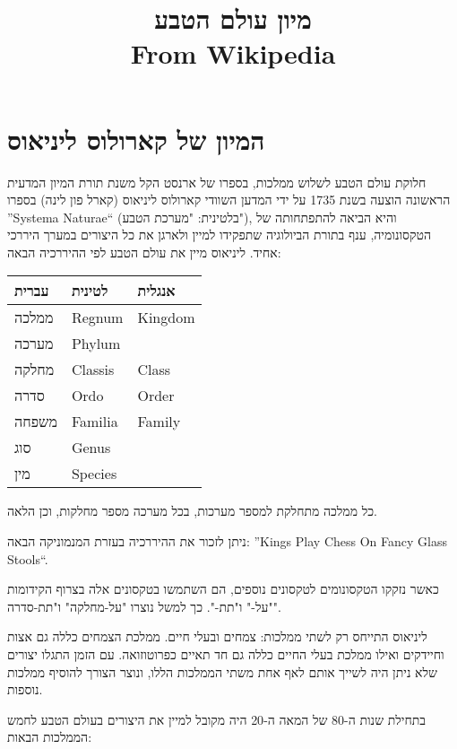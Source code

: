 \documentclass{article}
\title{מיון עולם הטבע\\\large From Wikipedia}
\begin{document}
\maketitle

\tableofcontents

\section{המיון של קארולוס ליניאוס}

חלוקת עולם הטבע לשלוש ממלכות, בספרו של ארנסט הקל משנת
תורת המיון המדעית הראשונה הוצעה בשנת 1735 על ידי המדען השוודי קארולוס
ליניאוס (קארל פון לינה) בספרו ”Systema Naturae“ (בלטינית: "מערכת
הטבע"), והיא הביאה להתפתחותה של הטקסונומיה, ענף בתורת הביולוגיה שתפקידו
למיין ולארגן את כל היצורים במערך היררכי אחיד. ליניאוס מיין את עולם הטבע
לפי ההיררכיה הבאה:

\begin{center}
  \begin{tabular}{|l|ll|}
    \hline
    עברית	 & לטינית	  & אנגלית   \\
    \hline
    ממלכה	& Regnum	  & Kingdom \\
    מערכה	& Phylum   &         \\
    מחלקה	& Classis	 & Class   \\
    סדרה	& Ordo	 & Order   \\
    משפחה	& Familia	 & Family  \\
    סוג	& Genus    &         \\
    מין	& Species  &         \\
    \hline
  \end{tabular}
\end{center}

כל ממלכה מתחלקת למספר מערכות, בכל מערכה מספר מחלקות, וכן הלאה.

ניתן לזכור את ההיררכיה בעזרת המנמוניקה הבאה: ”Kings Play Chess On Fancy
Glass Stools“.

כאשר נזקקו הטקסונומים לטקסונים נוספים, הם השתמשו בטקסונים אלה בצרוף
הקידומות "על-" ו"תת-". כך למשל נוצרו "על-מחלקה" ו"תת-סדרה".

ליניאוס התייחס רק לשתי ממלכות: צמחים ובעלי חיים. ממלכת הצמחים כללה גם
אצות וחיידקים ואילו ממלכת בעלי החיים כללה גם חד תאיים כפרוטוזואה. עם
הזמן התגלו יצורים שלא ניתן היה לשייך אותם לאף אחת משתי הממלכות הללו,
ונוצר הצורך להוסיף ממלכות נוספות.

בתחילת שנות ה-80 של המאה ה-20 היה מקובל למיין את היצורים בעולם הטבע
לחמש הממלכות הבאות:
\end{document}
